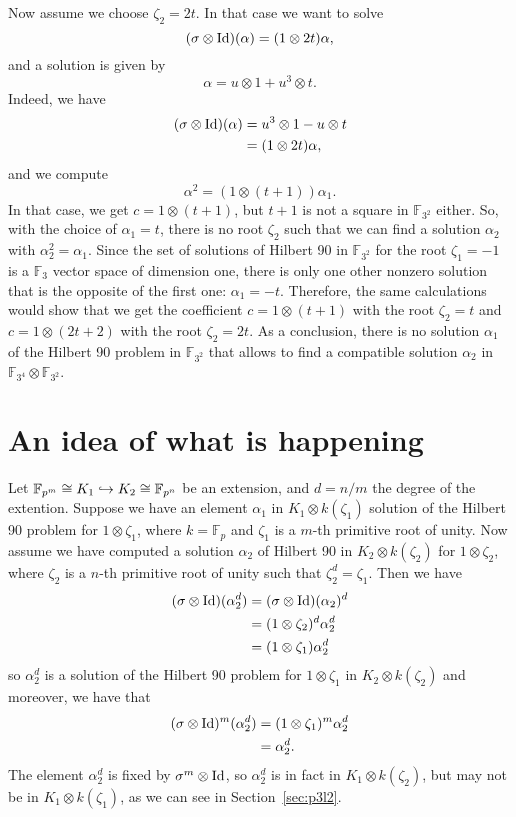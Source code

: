 \documentclass[a4paper,11pt]{article}
\begin{document}
Now assume we choose $\zeta_2=2t$. In that case we want to solve
\[
  (\sigma\otimes\operatorname{Id})(\alpha) = (1\otimes 2t)\alpha,
\]
and a solution is given by 
\[
  \alpha = u\otimes1 + u^3\otimes t.
\]
Indeed, we have
\begin{align*}
  (\sigma\otimes\operatorname{Id})(\alpha) &= u^3\otimes1-u\otimes t \\
  &= (1\otimes 2t)\alpha,
\end{align*}
and we compute
\[
  \alpha^2 = (1\otimes (t+1))\alpha_1.
\]
In that case, we get $c=1\otimes(t+1)$, but $t+1$ is not a square in
$\mathbb{F}_{3^2}$ either. So, with the choice of $\alpha_1=t$, there is no root
$\zeta_2$ such that we can find a solution $\alpha_2$ with
$\alpha_2^2=\alpha_1$. Since the set of solutions of Hilbert 90 in
$\mathbb{F}_{3^2}$ for the root $\zeta_1=-1$ is a $\mathbb{F}_3$ vector space of
dimension one, there is only one other nonzero solution that is the opposite of
the first one: $\alpha_1= -t$. Therefore, the same calculations would show that
we get the coefficient $c=1\otimes (t+1)$ with the root $\zeta_2=t$ and
$c=1\otimes(2t+2)$ with the root $\zeta_2=2t$. As a conclusion, there is no
solution $\alpha_1$ of the Hilbert 90 problem in $\mathbb{F}_{3^2}$ that allows to
find a compatible solution $\alpha_2$ in
$\mathbb{F}_{3^4}\otimes\mathbb{F}_{3^2}$.

\section{An idea of what is happening}
Let $\mathbb{F}_{p^m}\cong K_1\hookrightarrow K_2\cong \mathbb{F}_{p^n}$ be an extension,
and $d=n/m$ the degree of the extention. Suppose we have an element $\alpha_1$ in $K_1\otimes k(\zeta_1)$ solution of
the Hilbert 90 problem for $1\otimes\zeta_1$, where
$k=\mathbb{F}_p$ and $\zeta_1$ is a $m$-th primitive root of unity. Now assume
we have computed a solution $\alpha_2$ of Hilbert 90 in $K_2\otimes k(\zeta_2)$ for
$1\otimes\zeta_2$, where $\zeta_2$ is a $n$-th primitive root of unity such that
$\zeta_2^d=\zeta_1$. Then we have 
\begin{align*}
  (\sigma\otimes\operatorname{Id})(\alpha_2^d) &= (\sigma\otimes\operatorname{Id})(\alpha_2)^d \\
  &= (1\otimes\zeta_2)^d\alpha_2^d \\
  &= (1\otimes\zeta_1)\alpha_2^d
\end{align*}
so $\alpha_2^d$ is a solution of the Hilbert 90 problem for $1\otimes\zeta_1$ in
$K_2\otimes k(\zeta_2)$ and moreover, we have that
\begin{align*}
  (\sigma\otimes\operatorname{Id})^m(\alpha_2^d) &= (1\otimes\zeta_1)^m\alpha_2^d \\
  &= \alpha_2^d.
\end{align*}
The element $\alpha_2^d$ is fixed by $\sigma^m\otimes\operatorname{Id}$,
so $\alpha_2^d$ is in fact in $K_1\otimes k(\zeta_2)$, but may not be in
$K_1\otimes k(\zeta_1)$, as we can see in Section~\ref{sec:p3l2}.
\end{document}
